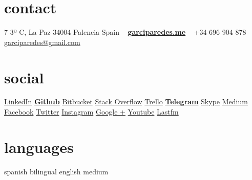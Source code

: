 \documentclass[]{friggeri-cv} %
\begin{document}


\begin{aside} %
\section{contact}
7 3º C, La Paz
34004 Palencia
Spain
~
\href{http://garciparedes.me}{\textbf{garciparedes.me}}
~
+34 696 904 878
\href{mailto:garciparedes@gmail.com}{garciparedes@gmail.com}
\section{social}
\href{https://es.linkedin.com/in/garciparedes/en}{LinkedIn\quad\faLinkedin }
\href{https://github.com/garciparedes}{\textbf{Github}\quad\faGithub }
\href{https://bitbucket.org/garciparedes/}{Bitbucket\quad\faBitbucket }
\href{http://stackoverflow.com/users/3921457/garciparedes}{Stack Overflow\quad\faStackOverflow }
\href{https://trello.com/garciparedes}{Trello\quad\faTrello }
\href{https://telegram.me/garciparedes}{\textbf{Telegram}\quad\faPaperPlane }
\href{skype:garciparedes?call}{Skype\quad\faSkype }
\href{https://medium.com/@garciparedes}{Medium\quad\faMedium }
\href{https://facebook.com/garciparedes}{Facebook\quad\faFacebook}
\href{https://twitter.com/garciparedes}{Twitter\quad\faTwitter }
\href{https://www.instagram.com/garciparedes/}{Instagram\quad\faInstagram }
\href{https://plus.google.com/+SergioGarcia-garciparedes/}{Google +\quad\faGooglePlus }
\href{https://www.youtube.com/user/GaRcYpArEdEs/}{Youtube\quad\faYoutubePlay }
\href{http://www.last.fm/user/garciparedes/}{Lastfm\quad\faLastfm}
\section{languages}
spanish bilingual
english medium
\begin{comment}
\section{programming}
Java\quad{\color{red} $\varheartsuit\varheartsuit\varheartsuit\varheartsuit\varheartsuit$}{\color{black} $\varheartsuit$}
Python\quad{\color{red} $\varheartsuit\varheartsuit\varheartsuit$}{\color{black} $\varheartsuit\varheartsuit\varheartsuit$}
JavaScript\quad{\color{red} $\varheartsuit\varheartsuit\varheartsuit\varheartsuit$}{\color{black} $\varheartsuit\varheartsuit$}
 C\quad{\color{red} $\varheartsuit\varheartsuit\varheartsuit\varheartsuit$}{\color{black} $\varheartsuit\varheartsuit$}
 C++\quad{\color{red} $\varheartsuit\varheartsuit\varheartsuit\varheartsuit$}{\color{black} $\varheartsuit\varheartsuit$}

\end{comment}
\end{aside}
\end{document}
